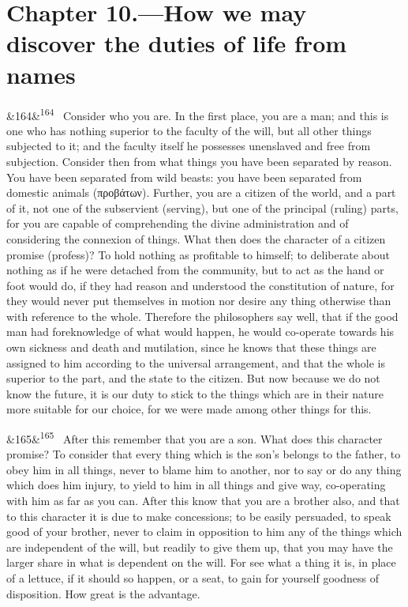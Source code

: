 \documentclass[12pt]{article}
\newcommand{\para}[1][]{\par\noindent\ifx&#1&\else\textsuperscript{\footnotesize #1}~\fi}
\begin{document}
\section*{Chapter 10.---How we may discover the duties of life from names}

\para[164] Consider who you are. In the first place, you are a man; and this is one who has nothing superior to the faculty of the will, but all other things subjected to it; and the faculty itself he possesses unenslaved and free from subjection. Consider then from what things you have been separated by reason. You have been separated from wild beasts: you have been separated from domestic animals (προβάτων). Further, you are a citizen of the world, and a part of it, not one of the subservient (serving), but one of the principal (ruling) parts, for you are capable of comprehending the divine administration and of considering the connexion of things. What then does the character of a citizen promise (profess)? To hold nothing as profitable to himself; to deliberate about nothing as if he were detached from the community, but to act as the hand or foot would do, if they had reason and understood the constitution of nature, for they would never put themselves in motion nor desire any thing otherwise than with reference to the whole. Therefore the philosophers say well, that if the good man had foreknowledge of what would happen, he would co-operate towards his own sickness and death and mutilation, since he knows that these things are assigned to him according to the universal arrangement, and that the whole is superior to the part, and the state to the citizen. But now because we do not know the future, it is our duty to stick to the things which are in their nature more suitable for our choice, for we were made among other things for this.

\para[165] After this remember that you are a son. What does this character promise? To consider that every thing which is the son's belongs to the father, to obey him in all things, never to blame him to another, nor to say or do any thing which does him injury, to yield to him in all things and give way, co-operating with him as far as you can. After this know that you are a brother also, and that to this character it is due to make concessions; to be easily persuaded, to speak good of your brother, never to claim in opposition to him any of the things which are independent of the will, but readily to give them up, that you may have the larger share in what is dependent on the will. For see what a thing it is, in place of a lettuce, if it should so happen, or a seat, to gain for yourself goodness of disposition. How great is the advantage.
\end{document}
